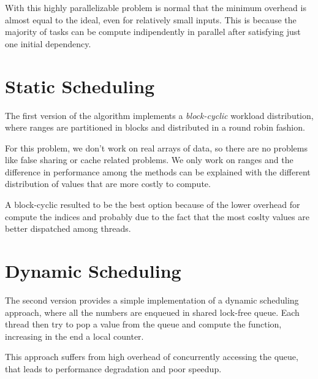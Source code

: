 \documentclass[12pt, a4paper]{article}
\begin{document}
With this highly parallelizable problem is normal that the minimum overhead is
almost equal to the ideal, even for relatively small inputs. This is because the
majority of tasks can be compute indipendently in parallel after satisfying just
one initial dependency.

\section{Static Scheduling}

The first version of the algorithm implements a \emph{block-cyclic} workload
distribution, where ranges are partitioned in blocks and distributed in a round
robin fashion.

For this problem, we don't work on real arrays of data, so there are no problems
like false sharing or cache related problems. We only work on ranges and the
difference in performance among the methods can be explained with the different
distribution of values that are more costly to compute. 

A block-cyclic resulted to be the best option because of the lower overhead for
compute the indices and probably due to the fact that the most coslty values are
better dispatched among threads.

\section{Dynamic Scheduling}

The second version provides a simple implementation of a dynamic scheduling
approach, where all the numbers are enqueued in shared lock-free queue. Each
thread then try to pop a value from the queue and compute the function,
increasing in the end a local counter.

This approach suffers from high overhead of concurrently accessing the queue,
that leads to performance degradation and poor speedup.
\end{document}
